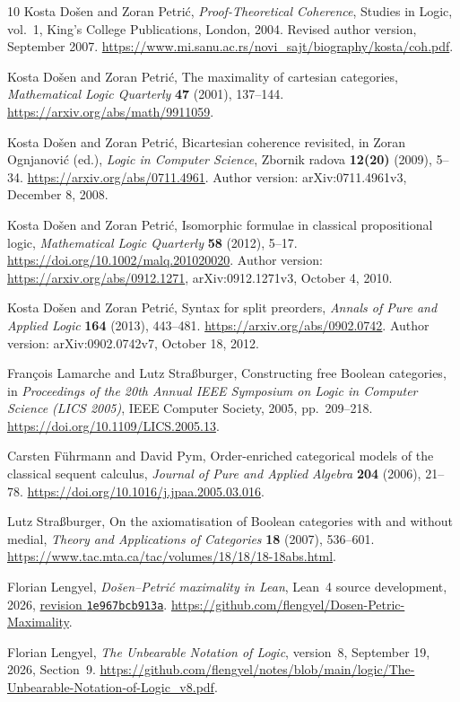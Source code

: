 \documentclass[11pt]{article}
\begin{document}
\clearpage
\begin{thebibliography}{10}
\small
\setlength{\itemsep}{2pt}
\setlength{\parskip}{0pt}
Kosta Do\v{s}en and Zoran Petri\'c,
\emph{Proof-Theoretical Coherence},
Studies in Logic, vol.~1, King's College Publications, London, 2004.
Revised author version, September 2007.
\url{https://www.mi.sanu.ac.rs/novi_sajt/biography/kosta/coh.pdf}.

Kosta Do\v{s}en and Zoran Petri\'c,
The maximality of cartesian categories,
\emph{Mathematical Logic Quarterly} \textbf{47} (2001), 137--144.
\url{https://arxiv.org/abs/math/9911059}.

Kosta Do\v{s}en and Zoran Petri\'c,
Bicartesian coherence revisited,
in Zoran Ognjanovi\'c (ed.), \emph{Logic in Computer Science},
Zbornik radova \textbf{12(20)} (2009), 5--34.
\url{https://arxiv.org/abs/0711.4961}.
Author version: arXiv:0711.4961v3, December 8, 2008.

Kosta Do\v{s}en and Zoran Petri\'c,
Isomorphic formulae in classical propositional logic,
\emph{Mathematical Logic Quarterly} \textbf{58} (2012), 5--17.
\url{https://doi.org/10.1002/malq.201020020}.
Author version: \url{https://arxiv.org/abs/0912.1271},
arXiv:0912.1271v3, October 4, 2010.

Kosta Do\v{s}en and Zoran Petri\'c,
Syntax for split preorders,
\emph{Annals of Pure and Applied Logic} \textbf{164} (2013), 443--481.
\url{https://arxiv.org/abs/0902.0742}.
Author version: arXiv:0902.0742v7, October 18, 2012.

Fran\c{c}ois Lamarche and Lutz Stra{\ss}burger,
Constructing free Boolean categories,
in \emph{Proceedings of the 20th Annual IEEE Symposium on Logic in
Computer Science (LICS 2005)}, IEEE Computer Society, 2005, pp.~209--218.
\url{https://doi.org/10.1109/LICS.2005.13}.

Carsten F\"uhrmann and David Pym,
Order-enriched categorical models of the classical sequent calculus,
\emph{Journal of Pure and Applied Algebra} \textbf{204} (2006), 21--78.
\url{https://doi.org/10.1016/j.jpaa.2005.03.016}.

Lutz Stra{\ss}burger,
On the axiomatisation of Boolean categories with and without medial,
\emph{Theory and Applications of Categories} \textbf{18} (2007),
536--601.
\url{https://www.tac.mta.ca/tac/volumes/18/18/18-18abs.html}.

Florian Lengyel,
\emph{Do\v{s}en--Petri\'c maximality in Lean},
Lean~4 source development, 2026,
\href{https://github.com/flengyel/Dosen-Petric-Maximality/tree/1e967bcb913a74ae590dde940f246acaddce1fba}{revision \texttt{1e967bcb913a}}.
\url{https://github.com/flengyel/Dosen-Petric-Maximality}.

Florian Lengyel,
\emph{The Unbearable Notation of Logic},
version~8, September 19, 2026, Section~9.
\url{https://github.com/flengyel/notes/blob/main/logic/The-Unbearable-Notation-of-Logic_v8.pdf}.
\end{thebibliography}
\end{document}
